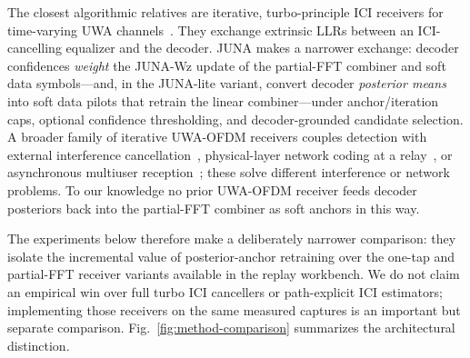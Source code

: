 \documentclass[journal]{IEEEtran}
\newcommand{\juna}{JUNA}
\newcommand{\junalite}{JUNA-lite}
\newcommand{\junawz}{JUNA-Wz}
\begin{document}
The closest algorithmic relatives are iterative, turbo-principle ICI receivers
for time-varying UWA channels~\cite{jhuang2011progressive,jhuang2010iterative}.
They exchange extrinsic LLRs between an ICI-cancelling equalizer and the decoder.
\juna{} makes a narrower exchange: decoder confidences \emph{weight} the
\junawz{} update of the partial-FFT combiner and soft data symbols---and, in the
\junalite{} variant, convert decoder \emph{posterior means} into soft data
pilots that retrain the linear combiner---under anchor/iteration caps, optional
confidence thresholding, and decoder-grounded candidate selection. A
broader family of iterative UWA-OFDM receivers couples detection with external
interference cancellation~\cite{zwang2012partialband}, physical-layer network
coding at a relay~\cite{zwang2013plnc}, or asynchronous multiuser
reception~\cite{zwang2013async}; these solve different interference or network
problems. To our knowledge no prior UWA-OFDM receiver feeds decoder posteriors
back into the partial-FFT combiner as soft anchors in this way.

The experiments below therefore make a deliberately narrower comparison: they
isolate the incremental value of posterior-anchor retraining over the one-tap
and partial-FFT receiver variants available in the replay workbench. We do not
claim an empirical win over full turbo ICI cancellers or path-explicit ICI
estimators; implementing those receivers on the same measured captures is an
important but separate comparison. Fig.~\ref{fig:method-comparison} summarizes
the architectural distinction.
\end{document}

